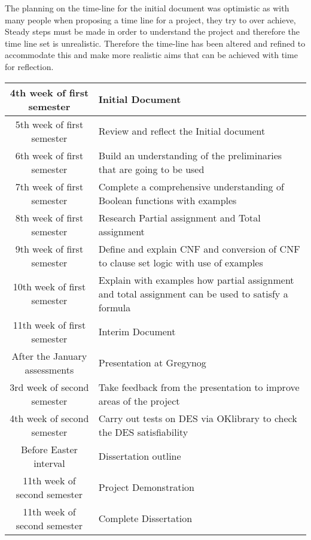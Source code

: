 \documentclass[11pt,a4paper]{article}
\begin{document}
The planning on the time-line for the initial document was optimistic as with many people when proposing a time line for a project, they try to over achieve, Steady steps must be made in order to understand the project and therefore the time line set is unrealistic. Therefore the time-line has been altered and refined to accommodate this and make more realistic aims that can be achieved with time for reflection.\\

\begin{tabular}{|c|p{5cm}|}
\hline
4th week of first semester & Initial Document \\\hline
5th week of first semester & Review and reflect the Initial document\\ \hline
6th week of first semester & Build an understanding of the preliminaries that are going to be used\\ \hline
7th week of first semester & Complete a comprehensive understanding of Boolean functions with examples\\ \hline
8th week of first semester & Research Partial assignment and Total assignment \\ \hline
9th week of first semester & Define and explain CNF and conversion of CNF to clause set logic with use of examples \\ \hline
10th week of first semester & Explain with examples how partial assignment and total assignment can be used to satisfy a formula\\\hline
11th week of first semester & Interim Document\\ \hline
After the January assessments & Presentation at Gregynog\\ \hline
3rd week of second semester & Take feedback from the presentation to improve areas of the project\\ \hline
4th week of second semester & Carry out tests on DES via OKlibrary to check the DES satisfiability\\ \hline 
Before Easter interval & Dissertation outline\\ \hline
11th week of second semester & Project Demonstration\\ \hline
11th week of second semester & Complete Dissertation\\ \hline
\hline

\end{tabular} 
\end{document}
